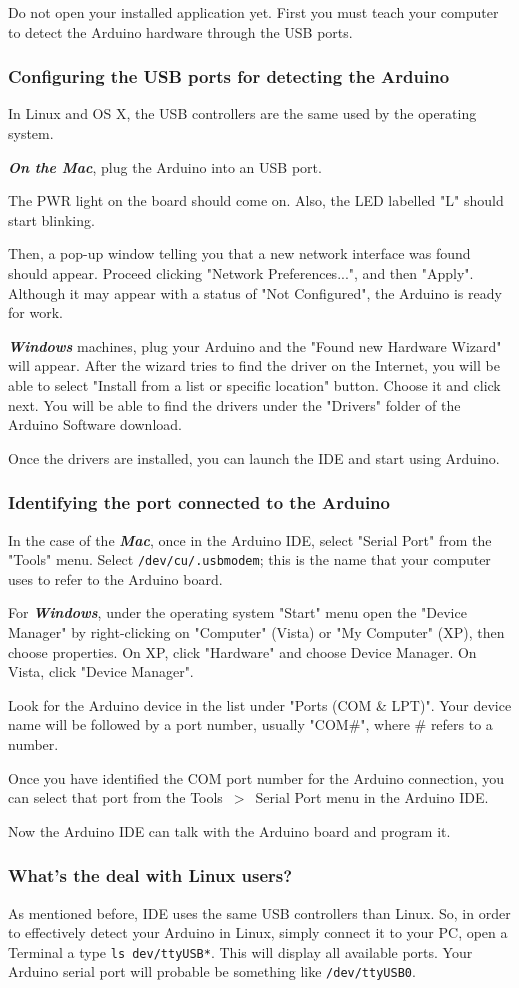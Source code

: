 Do not open your installed application yet. First you must teach your computer to detect the Arduino hardware through the USB ports.

\subsubsection{Configuring the USB ports for detecting the Arduino}
In Linux and OS X, the USB controllers are the same used by the operating system.

\emph{\bf{On the Mac}}, plug the Arduino into an USB port.

The PWR light on the board should come on. Also, the LED labelled "L" should start blinking.

Then, a pop-up window telling you that a new network interface was found should appear. Proceed clicking "Network Preferences...", and then "Apply". Although it may appear with a status of "Not Configured", the Arduino is ready for work.

\emph{\bf{Windows}} machines, plug your Arduino and the "Found new Hardware Wizard" will appear. After the wizard tries to find the driver on the Internet, you will be able to select "Install from a list or specific location" button. Choose it and click next. You will be able to find the drivers under the "Drivers" folder of the Arduino Software download.

Once the drivers are installed, you can launch the IDE and start using Arduino.

\subsubsection{Identifying the port connected to the Arduino}
In the case of the \emph{\bf{Mac}}, once in the Arduino IDE, select "Serial Port" from the "Tools" menu. Select \texttt{/dev/cu/.usbmodem}; this is the name that your computer uses to refer to the Arduino board.

For \emph{\bf{Windows}}, under the operating system "Start" menu open the "Device Manager" by right-clicking on "Computer" (Vista) or "My Computer" (XP), then choose properties. On XP, click "Hardware" and choose Device Manager. On Vista, click "Device Manager".

Look for the Arduino device in the list under "Ports (COM \& LPT)". Your device name will be followed by a port number, usually "COM\#", where \# refers to a number.

Once you have identified the COM port number for the Arduino connection, you can select that port from the Tools~$>$~Serial Port menu in the Arduino IDE.

Now the Arduino IDE can talk with the Arduino board and program it.

\subsubsection{What's the deal with Linux users?}
As mentioned before, IDE uses the same USB controllers than Linux. So, in order to effectively detect your Arduino in Linux, simply connect it to your PC, open a Terminal a type \texttt{ls dev/ttyUSB*}. This will display all available ports. Your Arduino serial port will probable be something like \texttt{/dev/ttyUSB0}.
